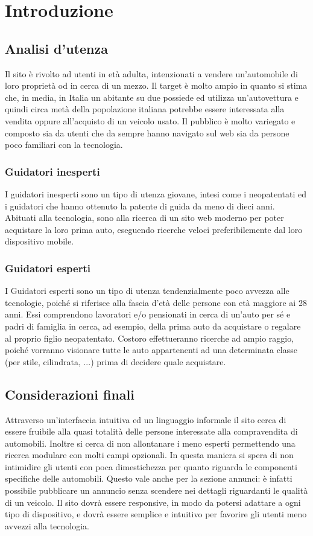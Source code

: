 \section{Introduzione}
	\subsection{Analisi d'utenza}
	\par Il sito è rivolto ad utenti in età adulta, intenzionati a vendere un’automobile di loro proprietà od in cerca di un mezzo. Il target è molto ampio in quanto si stima che, in media, in Italia un abitante su due possiede ed utilizza un'autovettura e quindi circa met\`a della popolazione italiana potrebbe essere interessata alla vendita oppure all'acquisto di un veicolo usato. Il pubblico è molto variegato e composto sia da utenti che da sempre hanno navigato sul web sia da persone poco familiari con la tecnologia.
	\subsubsection{Guidatori inesperti}
	\par I guidatori inesperti sono un tipo di utenza giovane, intesi come i neopatentati ed i guidatori che hanno ottenuto la patente di guida da meno di dieci anni. Abituati alla tecnologia, sono alla ricerca di un sito web moderno per poter acquistare la loro prima auto, eseguendo ricerche veloci preferibilemente dal loro dispositivo mobile.
	\subsubsection{Guidatori esperti}
	\par I Guidatori esperti sono un tipo di utenza tendenzialmente poco avvezza alle tecnologie, poiché si riferisce alla fascia d'età delle persone con età maggiore ai 28 anni. Essi comprendono lavoratori e/o pensionati in cerca di un'auto per sé e padri di famiglia in cerca, ad esempio, della prima auto da acquistare o regalare al proprio figlio neopatentato. Costoro effettueranno ricerche ad ampio raggio, poiché vorranno visionare tutte le auto appartenenti ad una determinata classe (per stile, cilindrata, ...) prima di decidere quale acquistare.
	\subsection{Considerazioni finali}
	\par Attraverso un’interfaccia intuitiva ed un linguaggio informale il sito cerca di essere fruibile alla quasi totalità delle persone interessate alla compravendita di automobili. Inoltre si cerca di non allontanare i meno esperti permettendo una ricerca modulare con molti campi opzionali. In questa maniera si spera di non intimidire gli utenti con poca dimestichezza per quanto riguarda le componenti specifiche delle automobili. Questo vale anche per la sezione annunci: è infatti possibile pubblicare un annuncio senza scendere nei dettagli riguardanti le qualità di un veicolo. Il sito dovrà essere responsive, in modo da potersi adattare a ogni tipo di dispositivo, e dovrà essere semplice e intuitivo per favorire gli utenti meno avvezzi alla tecnologia.
